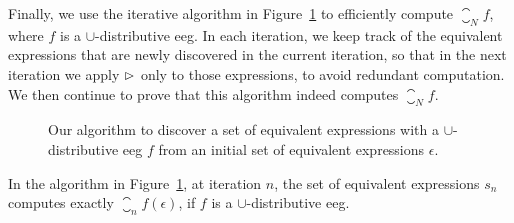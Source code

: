 Finally, we use the iterative algorithm in Figure~\ref{so:alg:closure} to
efficiently compute $\closure_N f$, where $f$ is a $\cup$-distributive
\gls{eeg}\@.  In each iteration, we keep track of the equivalent expressions
that are newly discovered in the current iteration, so that in the next
iteration we apply $\mathbin{\rhd}$ only to those expressions, to avoid redundant
computation.  We then continue to prove that this algorithm indeed computes
$\closure_N f$.
\begin{figure}[ht]
    \centering
    \begin{algorithmic}
                \EndIf{}
            \EndFor{}
        \EndFunction{}
    \end{algorithmic}
    \caption{%
        Our algorithm to discover a set of equivalent expressions with
        a $\cup$-distributive \gls{eeg} $f$ from an initial set of equivalent
        expressions $\epsilon$.
    }\label{so:alg:closure}
\end{figure}
\begin{theorem}
    In the algorithm in Figure~\ref{so:alg:closure}, at iteration $n$, the set
    of equivalent expressions $s_n$ computes exactly $\closure_n f(\epsilon)$,
    if $f$ is a $\cup$-distributive \gls{eeg}\@.
\end{theorem}

